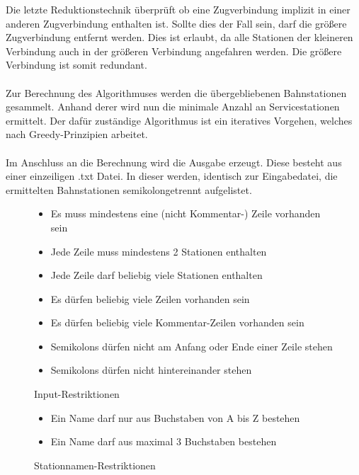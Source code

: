 Die letzte Reduktionstechnik überprüft ob eine Zugverbindung implizit in einer anderen Zugverbindung enthalten ist. Sollte dies der Fall sein, darf die größere Zugverbindung entfernt werden. Dies ist erlaubt, da alle Stationen der kleineren Verbindung auch in der größeren Verbindung angefahren werden. Die größere Verbindung ist somit redundant.\\
\\

Zur Berechnung des Algorithmuses werden die übergebliebenen Bahnstationen gesammelt. Anhand derer wird nun die minimale Anzahl an Servicestationen ermittelt. Der dafür zuständige Algorithmus ist ein iteratives Vorgehen, welches nach Greedy-Prinzipien arbeitet.\\
\\

Im Anschluss an die Berechnung wird die Ausgabe erzeugt. Diese besteht aus einer einzeiligen .txt Datei. In dieser werden, identisch zur Eingabedatei, die ermittelten Bahnstationen semikolongetrennt aufgelistet.\\

\begin{figure}[h]
    \centering
    \caption{Input-Restriktionen}
    \begin{itemize}[noitemsep]
        \item Es muss mindestens eine (nicht Kommentar-) Zeile vorhanden sein
        \item Jede Zeile muss mindestens 2 Stationen enthalten
        \item Jede Zeile darf beliebig viele Stationen enthalten
        \item Es dürfen beliebig viele Zeilen vorhanden sein
        \item Es dürfen beliebig viele Kommentar-Zeilen vorhanden sein
        \item Semikolons dürfen nicht am Anfang oder Ende einer Zeile stehen
        \item Semikolons dürfen nicht hintereinander stehen
    \end{itemize}
    \label{fig:input-restrictions}
\end{figure}

\begin{figure}[h]
    \centering
    \caption{Stationnamen-Restriktionen}
    \begin{itemize}[noitemsep]
        \item Ein Name darf nur aus Buchstaben von A bis Z bestehen
        \item Ein Name darf aus maximal 3 Buchstaben bestehen
    \end{itemize}
    \label{fig:stationname-restrictions}
\end{figure}


